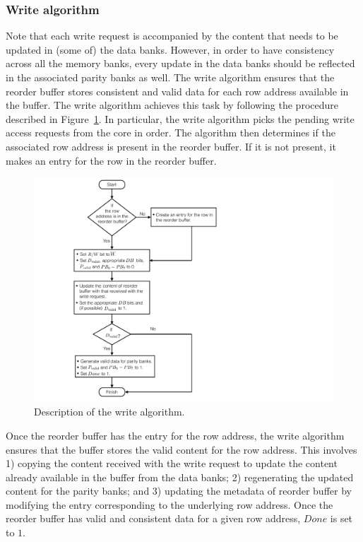 \subsubsection{Write algorithm}
\label{sec:write}
Note that each write request is accompanied by the content that needs to be updated in (some of) the data banks. However, in order to have consistency across all the memory banks, every update in the data banks should be reflected in the associated parity banks as well. The write algorithm ensures that the reorder buffer stores consistent and valid data for each row address available in the buffer. The write algorithm achieves this task by following the procedure described in Figure~\ref{fig:write}. In particular, the write algorithm picks the pending write access requests from the core in order. The algorithm then determines if the associated row address is present in the reorder buffer. If it is not present, it makes an entry for the row in the reorder buffer. 

\begin{figure}[h!] \centering
\includegraphics[width=0.80\linewidth]{figures/Write-algo-new.pdf} 
\caption{Description of the write algorithm.}
\label{fig:write}
\end{figure}


Once the reorder buffer has the entry for the row address, the write algorithm ensures that the buffer stores the valid content for the row address. This involves 1) copying the content received with the write request to update the content already available in the buffer from the data banks; 2) regenerating the updated content for the parity banks; and 3) updating the metadata of reorder buffer by modifying the entry corresponding to the underlying row address. Once the reorder buffer has valid and consistent data for a given row address, $Done$ is set to $1$. 


